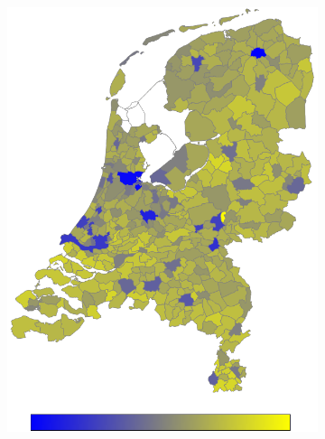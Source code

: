 \documentclass[a4paper,twoside,11pt]{article}
\begin{document}
\begin{figure}[h]
\begin{subfigure}[b]{0.118\textwidth}
                \includegraphics[width=\textwidth]{Heatmaps/HeatMap14.png}
                \caption{}
                \label{fig:Married}
        \end{subfigure}
        \begin{subfigure}[b]{0.118\textwidth}

\end{subfigure}
\end{figure}
\end{document}
